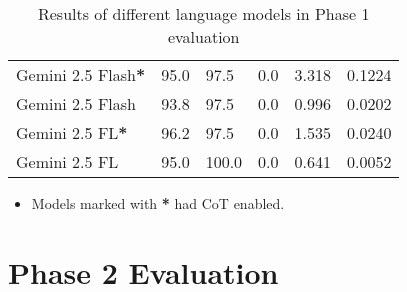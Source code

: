 \begin{table}[H]
\begin{tabularx}{\textwidth}{Xp{2.5cm}p{2.2cm}p{1.5cm}p{1.8cm}p{2cm}}
        \rowcolor[gray]{0.9}
        Gemini 2.5 Flash\textbf{*}  & 95.0                                  & 97.5                                  & 0.0                        & 3.318                         & 0.1224                           \\
        Gemini 2.5 Flash            & 93.8                                  & 97.5                                  & 0.0                        & 0.996                         & 0.0202                           \\
        \rowcolor[gray]{0.9}
        Gemini 2.5 FL\textbf{*}     & 96.2                                  & 97.5                                  & 0.0                        & 1.535                         & 0.0240                           \\
        Gemini 2.5 FL               & 95.0                                  & 100.0                                 & 0.0                        & 0.641                         & 0.0052                           \\
        \bottomrule
    \end{tabularx}

    \begin{itemize}
        \footnotesize
        \item Models marked with \textbf{*} had CoT enabled.
    \end{itemize}
    \caption{Results of different language models in Phase 1 evaluation}
    \label{tab:phase1_results}
\end{table}

\section{Phase 2 Evaluation}

